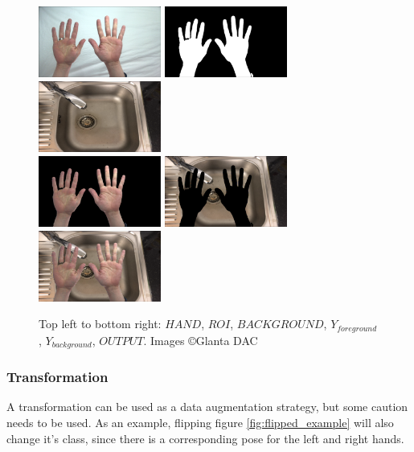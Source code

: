         \begin{figure}[h]
            \centering
            \includegraphics[width=114pt]{../img/handspipeline/1.png}
            \includegraphics[width=114pt]{../img/handspipeline/2.png}
            \includegraphics[width=114pt]{../img/handspipeline/3.png}\\
            \includegraphics[width=114pt]{../img/handspipeline/4.png}
            \includegraphics[width=114pt]{../img/handspipeline/5.png}
            \includegraphics[width=114pt]{../img/handspipeline/6.png}
            \caption{Top left to bottom right: $HAND$, $ROI$, $BACKGROUND$, $Y_{foreground}$, $Y_{background}$, $OUTPUT$. Images \copyright \space Glanta DAC}
            \label{fig:handlogicimg}
        \end{figure}

        \subsubsection{Transformation}
        A transformation can be used as a data augmentation strategy, but some caution needs to be used. As an example, flipping figure \ref{fig:flipped_example} will also change it's class, since there is a corresponding pose for the left and right hands. 

